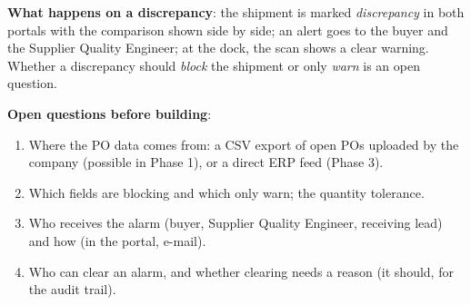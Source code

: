 \documentclass[11pt,a4paper]{article}
\begin{document}
\textbf{What happens on a discrepancy}: the shipment is marked \emph{discrepancy} in both portals with the comparison
shown side by side; an alert goes to the buyer and the Supplier Quality Engineer; at the dock, the scan shows a clear
warning. Whether a discrepancy should \emph{block} the shipment or only \emph{warn} is an open question.

\textbf{Open questions before building}:
\begin{enumerate}
  \item Where the PO data comes from: a CSV export of open POs uploaded by the company (possible in Phase 1), or a
    direct ERP feed (Phase 3).
  \item Which fields are blocking and which only warn; the quantity tolerance.
  \item Who receives the alarm (buyer, Supplier Quality Engineer, receiving lead) and how (in the portal, e-mail).
  \item Who can clear an alarm, and whether clearing needs a reason (it should, for the audit trail).
\end{enumerate}
\end{document}
